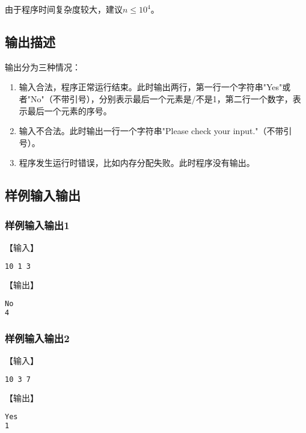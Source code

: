 \documentclass{article}
\begin{document}
由于程序时间复杂度较大，建议$n \leq 10^4$。

\subsection{输出描述}

输出分为三种情况：

\begin{enumerate}
    \item 输入合法，程序正常运行结束。此时输出两行，第一行一个字符串"Yes"或者"No"（不带引号），分别表示最后一个元素是/不是1，第二行一个数字，表示最后一个元素的序号。
    \item 输入不合法。此时输出一行一个字符串"Please check your input."（不带引号）。
    \item 程序发生运行时错误，比如内存分配失败。此时程序没有输出。
\end{enumerate}

\subsection{样例输入输出}

\subsubsection{样例输入输出1}

【输入】

\begin{lstlisting}[language={bash},
    basicstyle=\small\menlo]
10 1 3
\end{lstlisting}

【输出】

\begin{lstlisting}[language={bash},
    basicstyle=\small\menlo]
No
4
\end{lstlisting}

\subsubsection{样例输入输出2}

【输入】

\begin{lstlisting}[language={bash},
    basicstyle=\small\menlo]
10 3 7
\end{lstlisting}

【输出】

\begin{lstlisting}[language={bash},
    basicstyle=\small\menlo]
Yes
1
\end{lstlisting}
\end{document}
